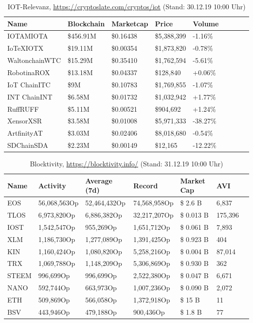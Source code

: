 \begin{table}[]
\centering
\begin{tabular}{@{}lllllllll@{}}
\toprule
\textbf{Name} & \textbf{Blockchain} & \textbf{Marketcap} & \textbf{Price} & \textbf{Volume} \\ \midrule
IOTAMIOTA & \$456.91M & \$0.16438 & \$5,388,399 & -1.16\% \\
IoTeXIOTX & \$19.11M & \$0.00354 & \$1,873,820 & -0.78\% \\
WaltonchainWTC & \$15.29M & \$0.35410 & \$1,762,594 & -5.61\% \\
RobotinaROX & \$13.18M & \$0.04337 & \$128,840 & +0.06\% \\
IoT ChainITC & \$9M & \$0.10783 & \$1,769,855 & -1.07\% \\
INT ChainINT & \$6.58M & \$0.01732 & \$1,032,942 & +1.77\% \\
RuffRUFF & \$5.11M & \$0.00521 & \$904,692 & +1.24\% \\
XensorXSR & \$3.58M & \$0.01008 & \$5,971,333 & -38.27\% \\
ArtfinityAT & \$3.03M & \$0.02406 & \$8,018,680 & -0.54\% \\
SDChainSDA & \$2.23M & \$0.00149 & \$12,165 & -12.22\% \\ \bottomrule
\end{tabular}
\caption[IOT-Relevanz]{IOT-Relevanz, \url{https://cryptoslate.com/cryptos/iot} (Stand: 30.12.19 10:00 Uhr)}
\label{tab:_iot}
\end{table}



\begin{table}[]
\centering
\begin{tabular}{@{}lllllll@{}}
\toprule
\textbf{Name} & \textbf{Activity} & \textbf{Average (7d)} & \textbf{Record} & \textbf{Market Cap} & \textbf{AVI} \\ \midrule
EOS & 56,068,563Op & 52,464,432Op & 74,568,958Op & \$ 2.6 B & 6,837 \\
TLOS & 6,973,820Op & 6,886,382Op & 32,217,207Op & \$ 0.013 B & 175,396 \\
IOST & 1,542,547Op & 955,269Op & 1,651,712Op & \$ 0.061 B & 7,893 \\
XLM & 1,186,730Op & 1,277,089Op & 1,391,425Op & \$ 0.923 B & 404 \\
KIN & 1,160,424Op & 1,080,820Op & 5,258,216Op & \$ 0.004 B & 87,014 \\
TRX & 1,069,788Op & 1,148,209Op & 5,306,869Op & \$ 0.930 B & 362 \\
STEEM & 996,699Op & 996,699Op & 2,522,380Op & \$ 0.047 B & 6,671 \\
NANO & 592,744Op & 663,973Op & 1,007,236Op & \$ 0.090 B & 2,072 \\
ETH & 509,869Op & 566,058Op & 1,372,918Op & \$ 15 B & 11 \\
BSV & 443,946Op & 479,188Op & 900,436Op & \$ 1.8 B & 77 \\ \bottomrule
\end{tabular}
\caption[Blocktivity]{Blocktivity, \url{https://blocktivity.info/} (Stand: 31.12.19 10:00 Uhr)}
\label{tab:_blocktivity}
\end{table}



